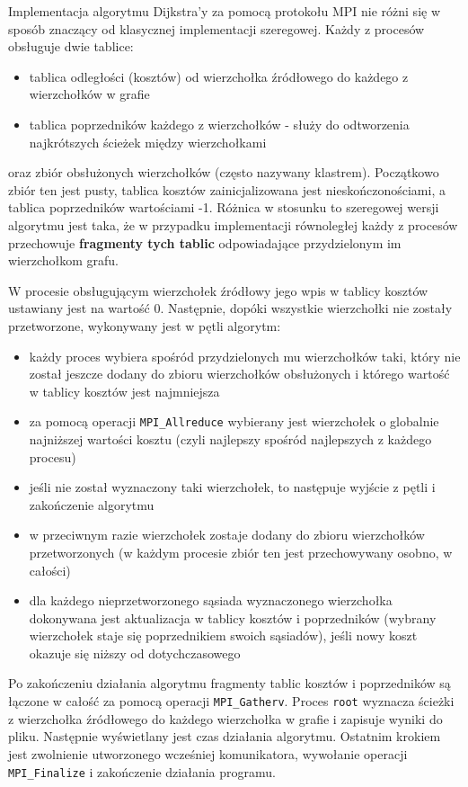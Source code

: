 \documentclass[12pt]{article}
\begin{document}
Implementacja algorytmu Dijkstra'y za pomocą protokołu MPI nie różni się w sposób znaczący od klasycznej implementacji szeregowej. Każdy z procesów obsługuje dwie tablice: 
\begin{itemize}
\item tablica odległości (kosztów) od wierzchołka źródłowego do każdego z wierzchołków w grafie
\item tablica poprzedników każdego z wierzchołków - służy do odtworzenia najkrótszych ścieżek między wierzchołkami
\end{itemize}
oraz zbiór obsłużonych wierzchołków (często nazywany klastrem). Początkowo zbiór ten jest pusty, tablica kosztów zainicjalizowana jest nieskończonościami, a tablica poprzedników wartościami -1. Różnica w stosunku to szeregowej wersji algorytmu jest taka, że w przypadku implementacji równoległej każdy z procesów przechowuje \textbf{fragmenty tych tablic} odpowiadające przydzielonym im wierzchołkom grafu.

W procesie obsługującym wierzchołek źródłowy jego wpis w tablicy kosztów ustawiany jest na wartość 0. Następnie, dopóki wszystkie wierzchołki nie zostały przetworzone, wykonywany jest w pętli algorytm:
\begin{itemize}
\item każdy proces wybiera spośród przydzielonych mu wierzchołków taki, który nie został jeszcze dodany do zbioru wierzchołków obsłużonych i którego wartość w tablicy kosztów jest najmniejsza
\item za pomocą operacji \lstinline{MPI_Allreduce} wybierany jest wierzchołek o globalnie najniższej wartości kosztu (czyli najlepszy spośród najlepszych z każdego procesu)
\item jeśli nie został wyznaczony taki wierzchołek, to następuje wyjście z pętli i zakończenie algorytmu
\item w przeciwnym razie wierzchołek zostaje dodany do zbioru wierzchołków przetworzonych (w każdym procesie zbiór ten jest przechowywany osobno, w całości)
\item dla każdego nieprzetworzonego sąsiada wyznaczonego wierzchołka dokonywana jest aktualizacja w tablicy kosztów i poprzedników (wybrany wierzchołek staje się poprzednikiem swoich sąsiadów), jeśli nowy koszt okazuje się niższy od dotychczasowego
\end{itemize}
Po zakończeniu działania algorytmu fragmenty tablic kosztów i poprzedników są łączone w całość za pomocą operacji \lstinline{MPI_Gatherv}. Proces \lstinline{root} wyznacza ścieżki z wierzchołka źródłowego do każdego wierzchołka w grafie i zapisuje wyniki do pliku. Następnie wyświetlany jest czas działania algorytmu. Ostatnim krokiem jest zwolnienie utworzonego wcześniej komunikatora, wywołanie operacji \lstinline{MPI_Finalize} i zakończenie działania programu.
\end{document}
